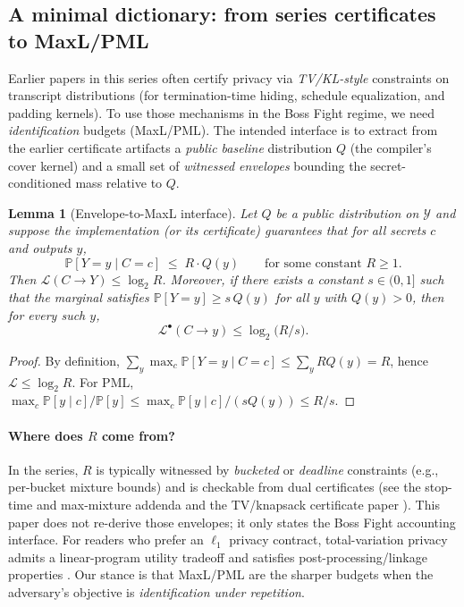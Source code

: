 \documentclass[11pt]{article}
\newcommand{\Prb}{\mathbb{P}}
\newcommand{\MaxL}{\mathcal{L}}
\newcommand{\PML}{\mathcal{L}^{\bullet}}
\newcommand{\logtwo}{\log_2}
\newcommand{\Y}{\mathcal{Y}} %
\newtheorem{lemma}{Lemma}
\begin{document}
\subsection{A minimal dictionary: from series certificates to MaxL/PML}
Earlier papers in this series often certify privacy via \emph{TV/KL-style} constraints on transcript distributions (for termination-time hiding, schedule equalization, and padding kernels).
To use those mechanisms in the Boss Fight regime, we need \emph{identification} budgets (MaxL/PML).
The intended interface is to extract from the earlier certificate artifacts a \emph{public baseline} distribution $Q$ (the compiler's cover kernel) and a small set of \emph{witnessed envelopes} bounding the secret-conditioned mass relative to $Q$.

\begin{lemma}[Envelope-to-MaxL interface]\label{lem:envelope}
Let $Q$ be a public distribution on $\Y$ and suppose the implementation (or its certificate) guarantees that for all secrets $c$ and outputs $y$,
\[
\Prb[Y=y\mid C=c]\;\le\; R\cdot Q(y)
\qquad\text{for some constant }R\ge 1.
\]
Then $\MaxL(C\to Y)\le \logtwo R$.
Moreover, if there exists a constant $s\in(0,1]$ such that the marginal satisfies $\Prb[Y=y]\ge s\,Q(y)$ for all $y$ with $Q(y)>0$, then for every such $y$,
\[
\PML(C\!\to\!y)\le \logtwo\!\big(R/s\big).
\]
\end{lemma}
\begin{proof}
By definition,
$\sum_y\max_c \Prb[Y=y\mid C=c]\le \sum_y RQ(y)=R$, hence $\MaxL\le\logtwo R$.
For PML, $\max_c \Prb[y\mid c]/\Prb[y]\le \max_c \Prb[y\mid c]/(sQ(y))\le R/s$.
\end{proof}


\paragraph{Where does $R$ come from?}
In the series, $R$ is typically witnessed by \emph{bucketed} or \emph{deadline} constraints (e.g., per-bucket mixture bounds) and is checkable from dual certificates (see the stop-time and max-mixture addenda \cite{series:stoptimeaddendum} and the TV/knapsack certificate paper \cite{series:knapsacktransport}).
This paper does not re-derive those envelopes; it only states the Boss Fight accounting interface.
For readers who prefer an $\ell_1$ privacy contract, total-variation privacy admits a linear-program utility tradeoff and satisfies post-processing/linkage properties \cite{rassouli2018tv}.
Our stance is that MaxL/PML are the sharper budgets when the adversary's objective is \emph{identification under repetition}.
\end{document}
